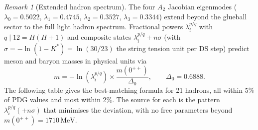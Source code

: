 \documentclass[11pt,a4paper]{article}
\theoremstyle{definition}
\theoremstyle{remark}
\newtheorem{remark}[theorem]{Remark}
\begin{document}
\begin{remark}[Extended hadron spectrum]\label{rem:hadrons}
The four $A_2$ Jacobian eigenmodes ($\lambda_0=0.5022$, $\lambda_1=0.4745$, $\lambda_2=0.3527$, $\lambda_3=0.3344$) extend beyond the glueball sector to the full light hadron spectrum. Fractional powers $\lambda_i^{p/q}$ with $q\mid 12=H(H+1)$ and composite states $\lambda_i^{p/q}+n\sigma$ (with $\sigma=-\ln(1-K^*)=\ln(30/23)$ the string tension unit per DS step) predict meson and baryon masses in physical units via
\[
m = -\ln(\lambda_i^{p/q})\times\frac{m(0^{++})}{\Delta_0}, \qquad \Delta_0 = 0.6888.
\]
The following table gives the best-matching formula for 21 hadrons, all within $5\%$ of PDG values and most within $2\%$. The source for each is the pattern $\lambda_i^{p/q}(+n\sigma)$ that minimises the deviation, with no free parameters beyond $m(0^{++})=1710\,\mathrm{MeV}$.


\end{remark}
\end{document}
